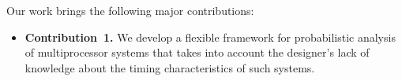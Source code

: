 Our work brings the following major contributions:
\begin{itemize}

\item \textbf{Contribution~1.} We develop a flexible framework for probabilistic
  analysis of multiprocessor systems that takes into account the designer's lack
  of knowledge about the timing characteristics of such systems.

\end{itemize}
